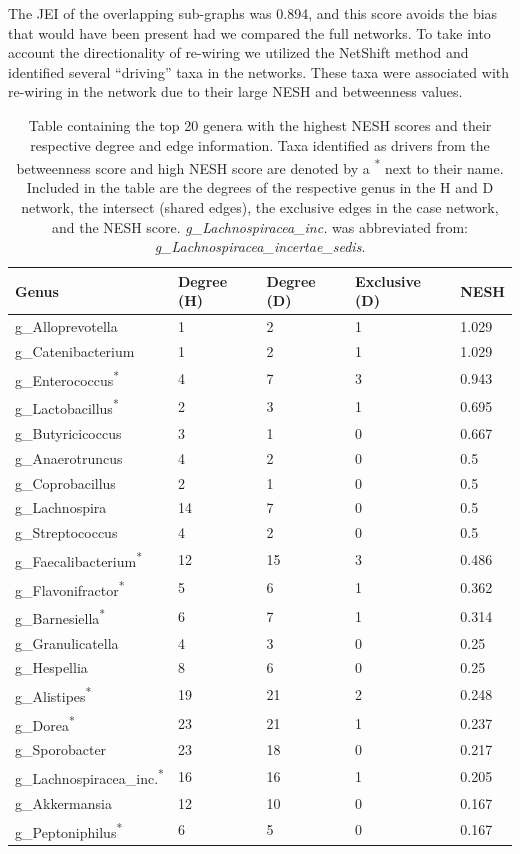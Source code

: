 The \acrfull{JEI} of the overlapping sub-graphs was 0.894, and this score avoids the bias that would have been present had we compared the full networks. To take into account the directionality of re-wiring we utilized the NetShift method and identified several ``driving'' taxa in the networks. These taxa were associated with re-wiring in the network due to their large \acrshort{NESH} and betweenness values.
\begin{table}[!hbt]
\centering
\begin{tabular}{lllll}
\toprule
Genus & Degree (H) & Degree (D)  & Exclusive (D) &\acrshort{NESH}\\
\midrule
g\_Alloprevotella & 1 & 2 & 1 & 1.029\\
g\_Catenibacterium & 1 & 2 & 1 & 1.029\\
g\_Enterococcus\textsuperscript{*} & 4 & 7 & 3 & 0.943\\
g\_Lactobacillus\textsuperscript{*} & 2 & 3 & 1 & 0.695\\
g\_Butyricicoccus & 3 & 1 & 0 & 0.667\\
g\_Anaerotruncus & 4 & 2 & 0 & 0.5\\
g\_Coprobacillus & 2 & 1 & 0 & 0.5\\
g\_Lachnospira & 14 & 7 & 0 & 0.5\\
g\_Streptococcus & 4 & 2 & 0 & 0.5\\
g\_Faecalibacterium\textsuperscript{*} & 12 & 15 & 3 & 0.486\\
g\_Flavonifractor\textsuperscript{*} & 5 & 6 & 1 & 0.362\\
g\_Barnesiella\textsuperscript{*} & 6 & 7 & 1 & 0.314\\
g\_Granulicatella & 4 & 3 & 0 & 0.25\\
g\_Hespellia & 8 & 6 & 0 & 0.25\\
g\_Alistipes\textsuperscript{*} & 19 & 21 & 2 & 0.248\\
g\_Dorea\textsuperscript{*} & 23 & 21 & 1 & 0.237\\
g\_Sporobacter & 23 & 18 & 0 & 0.217\\
g\_Lachnospiracea\_inc.\textsuperscript{*}& 16 & 16 & 1 & 0.205\\
g\_Akkermansia & 12 & 10 & 0 & 0.167\\
g\_Peptoniphilus\textsuperscript{*} & 6 & 5 & 0 & 0.167\\
  \bottomrule
\end{tabular}
\caption[Table containing the top 20 genera with the highest \acrshort{NESH} scores and their respective degree and edge information.]{Table containing the top 20 genera with the highest \acrshort{NESH} scores and their respective degree and edge information. Taxa identified as drivers from the betweenness score and high \acrshort{NESH} score are denoted by a \textsuperscript{*} next to their name. Included in the table are the degrees of the respective genus in the \acrfull{H} and \acrfull{D} network, the intersect (shared edges), the exclusive edges in the case network, and the \acrshort{NESH} score. \textit{g\_Lachnospiracea\_inc.} was abbreviated from: \textit{g\_Lachnospiracea\_incertae\_sedis}. }
\label{tab:nesh}
\end{table}
